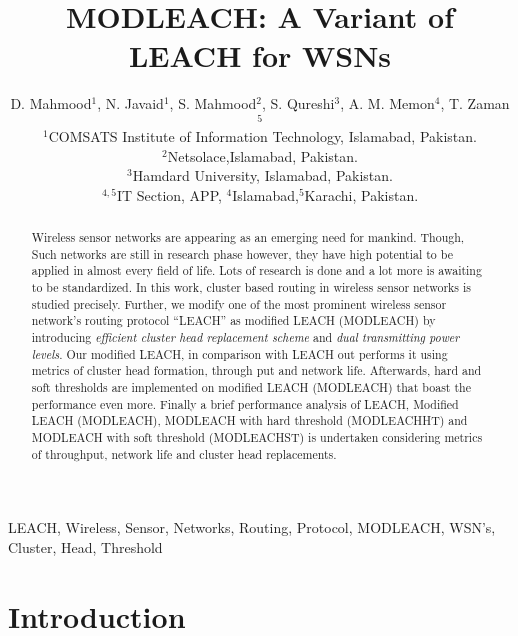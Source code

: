 \documentclass[10pt, conference, compsocconf]{IEEEtran}
\begin{document}
\title{ MODLEACH: A Variant of LEACH for WSNs}

\author{D. Mahmood$^{1}$, N. Javaid$^{1}$, S. Mahmood$^{2}$, S. Qureshi$^{3}$, A. M. Memon$^{4}$, T. Zaman$^{5}$\\
        $^{1}$COMSATS Institute of Information Technology, Islamabad, Pakistan.\\
        $^{2}$Netsolace,Islamabad, Pakistan.\\
        $^{3}$Hamdard University, Islamabad, Pakistan.\\
        $^{4,5}$IT Section, APP, $^{4}$Islamabad,$^{5}$Karachi, Pakistan.\\
     }

\maketitle
\begin{abstract}

Wireless sensor networks are appearing as an emerging need for mankind. Though, Such networks are still in research phase however, they have high potential to be applied in almost every field of life. Lots of research is done and a lot more is awaiting to be standardized. In this work, cluster based routing in wireless sensor networks is studied precisely. Further, we modify one of the most prominent wireless sensor network's routing protocol ``LEACH'' as modified LEACH (MODLEACH) by introducing \emph{efficient cluster head replacement scheme} and \emph{dual transmitting power levels}. Our modified LEACH, in comparison with LEACH out performs it using metrics of cluster head formation, through put and network life. Afterwards, hard and soft thresholds are implemented on modified LEACH (MODLEACH) that boast the performance even more. Finally a brief performance analysis of LEACH, Modified LEACH (MODLEACH), MODLEACH with hard threshold (MODLEACHHT) and MODLEACH with soft threshold (MODLEACHST) is undertaken considering metrics of throughput, network life and cluster head replacements.
\end{abstract}

\begin{IEEEkeywords}
LEACH, Wireless, Sensor, Networks, Routing, Protocol, MODLEACH, WSN's, Cluster, Head, Threshold
\end{IEEEkeywords}

\section{Introduction}
\end{document}
